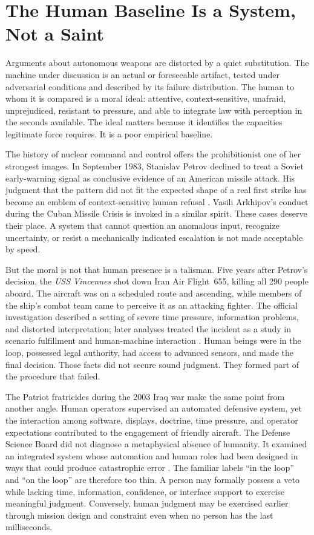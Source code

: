 \documentclass[11pt]{article}
\begin{document}
\section{The Human Baseline Is a System, Not a Saint}
\label{sec:baseline}

Arguments about autonomous weapons are distorted by a quiet substitution. The machine under discussion is an actual or foreseeable artifact, tested under adversarial conditions and described by its failure distribution. The human to whom it is compared is a moral ideal: attentive, context-sensitive, unafraid, unprejudiced, resistant to pressure, and able to integrate law with perception in the seconds available. The ideal matters because it identifies the capacities legitimate force requires. It is a poor empirical baseline.

The history of nuclear command and control offers the prohibitionist one of her strongest images. In September 1983, Stanislav Petrov declined to treat a Soviet early-warning signal as conclusive evidence of an American missile attack. His judgment that the pattern did not fit the expected shape of a real first strike has become an emblem of context-sensitive human refusal \citep{hoffman2009, scharre2018}. Vasili Arkhipov's conduct during the Cuban Missile Crisis is invoked in a similar spirit. These cases deserve their place. A system that cannot question an anomalous input, recognize uncertainty, or resist a mechanically indicated escalation is not made acceptable by speed.

But the moral is not that human presence is a talisman. Five years after Petrov's decision, the \textit{USS Vincennes} shot down Iran Air Flight~655, killing all 290 people aboard. The aircraft was on a scheduled route and ascending, while members of the ship's combat team came to perceive it as an attacking fighter. The official investigation described a setting of severe time pressure, information problems, and distorted interpretation; later analyses treated the incident as a study in scenario fulfillment and human-machine interaction \citep{fogarty1988, scharre2018}. Human beings were in the loop, possessed legal authority, had access to advanced sensors, and made the final decision. Those facts did not secure sound judgment. They formed part of the procedure that failed.

The Patriot fratricides during the 2003 Iraq war make the same point from another angle. Human operators supervised an automated defensive system, yet the interaction among software, displays, doctrine, time pressure, and operator expectations contributed to the engagement of friendly aircraft. The Defense Science Board did not diagnose a metaphysical absence of humanity. It examined an integrated system whose automation and human roles had been designed in ways that could produce catastrophic error \citep{dsb2005}. The familiar labels ``in the loop'' and ``on the loop'' are therefore too thin. A person may formally possess a veto while lacking time, information, confidence, or interface support to exercise meaningful judgment. Conversely, human judgment may be exercised earlier through mission design and constraint even when no person has the last milliseconds.
\end{document}
